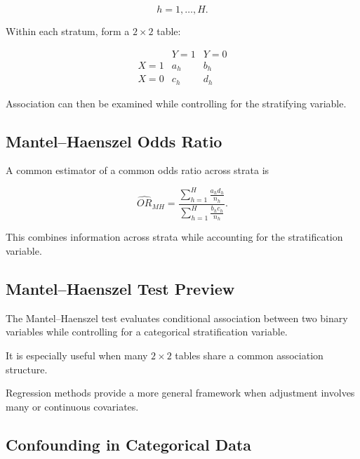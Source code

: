 \[
h=1,\ldots,H.
\]

Within each stratum, form a \(2\times2\) table:

\[
\begin{array}{c|cc}
&
Y=1
&
Y=0
\\
\hline
X=1
&
a_h
&
b_h
\\
X=0
&
c_h
&
d_h
\end{array}
\]

Association can then be examined while controlling for the stratifying
variable.

\subsection{Mantel--Haenszel Odds Ratio}
\label{subsec:mantel-haenszel-odds-ratio}

A common estimator of a common odds ratio across strata is

\[
\boxed{
\widehat{OR}_{MH}
=
\frac{
\sum_{h=1}^{H}
\frac{
a_hd_h
}{
n_h
}
}{
\sum_{h=1}^{H}
\frac{
b_hc_h
}{
n_h
}
}.
}
\]

This combines information across strata while accounting for the
stratification variable.

\subsection{Mantel--Haenszel Test Preview}
\label{subsec:mantel-haenszel-test-preview}

The Mantel--Haenszel test evaluates conditional association between two
binary variables while controlling for a categorical stratification
variable.

It is especially useful when many \(2\times2\) tables share a common
association structure.

Regression methods provide a more general framework when adjustment
involves many or continuous covariates.

\subsection{Confounding in Categorical Data}
\label{subsec:categorical-confounding}

